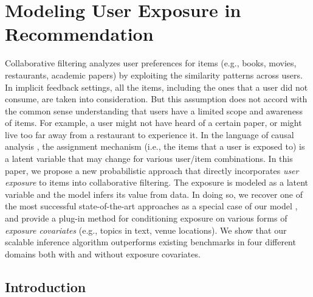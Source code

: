 

\chapter{Modeling User Exposure in Recommendation} \label{chpt:expomf}





Collaborative filtering analyzes user preferences for items (e.g., books,
movies, restaurants, academic papers) by exploiting the similarity patterns
across users. In implicit feedback settings, all the items, including the ones 
that a user did not consume, are taken into consideration. But this
assumption does not accord with the common sense understanding that users have
a limited scope and awareness of items. For example, a user might not have
heard of a certain paper, or might live too far away from a restaurant to
experience it. In the language of causal analysis \cite{imbens2015causal}, the
assignment mechanism (i.e., the items that a user is exposed to) is a latent
variable that may change for various user/item combinations. 
In this paper, we propose a new probabilistic approach that directly
incorporates \emph{user exposure} to items into collaborative filtering.
The exposure is modeled as a latent variable and the model infers its
value from data. In doing so, we recover one of the most successful
state-of-the-art approaches as a special case of our model
\cite{hu2008collaborative}, and provide a plug-in method for conditioning
exposure on various forms of \emph{exposure covariates} (e.g., topics in text,
venue locations). We show that our scalable inference algorithm
outperforms existing benchmarks in four different domains both with and
without exposure covariates.





\section{Introduction}
\label{sec:introduction}


